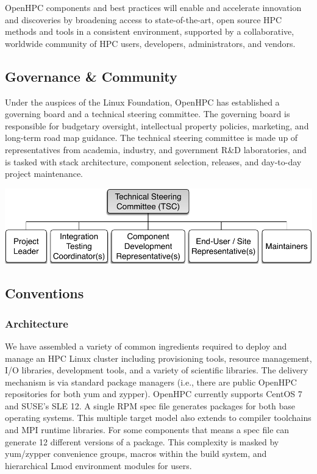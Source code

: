 \documentclass{sig-alternate-05-2015}
\begin{document}
OpenHPC components and best practices will enable and accelerate innovation and
discoveries by broadening access to state-of-the-art, open source HPC methods
and tools in a consistent environment, supported by a collaborative, worldwide
community of HPC users, developers, administrators, and vendors.



\subsection{Governance \& Community}
Under the auspices of the Linux Foundation, OpenHPC has established a governing
board and a technical steering committee. The governing board is responsible for
budgetary oversight, intellectual property policies, marketing, and long-term
road map guidance. The technical steering committee is made up of representatives
from academia, industry, and government R\&D laboratories, and is tasked with
stack architecture, component selection, releases, and day-to-day project
maintenance.

\includegraphics[width=1.0\linewidth]{figures/governance}

\subsection{Conventions}
\subsubsection{Architecture}
We have assembled a variety of common ingredients required to deploy and manage 
an HPC Linux cluster including provisioning tools, resource management, I/O 
libraries, development tools, and a variety of scientific libraries. The 
delivery mechanism is via standard package managers (i.e., there are public 
OpenHPC repositories for both yum and zypper). OpenHPC currently supports CentOS
7 and SUSE's SLE 12. A single RPM spec file generates packages for both base
operating systems. This multiple target model also extends to compiler
toolchains and MPI runtime libraries. For some components that means a spec file
can generate 12 different versions of a package. This complexity is masked by
yum/zypper convenience groups, macros within the build system, and hierarchical 
Lmod environment modules for users.
\end{document}
